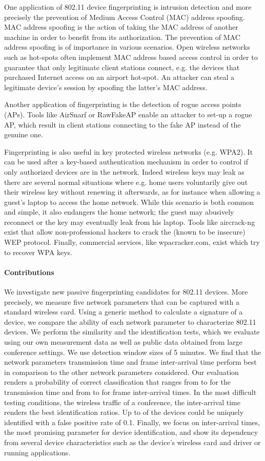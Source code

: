 \documentclass[10pt, conference, compsocconf, letterpaper]{IEEEtran}
\begin{document}
One application of 802.11 device fingerprinting is intrusion detection and more precisely
the prevention of Medium Access Control (MAC) address spoofing. 
MAC address spoofing is the action of taking the MAC address of another machine in order to 
benefit from its authorization. The prevention of MAC address spoofing is of importance in various scenarios.
Open wireless networks such as hot-spots often implement MAC address based access control in order
to guarantee that only legitimate client stations connect, e.g. the devices that purchased Internet access 
on an airport hot-spot.
An attacker can steal a legitimate device's session by spoofing the latter's MAC address.

Another application of fingerprinting is the detection of rogue access points (APs). 
Tools like AirSnarf 
or RawFakeAP 
enable an attacker to set-up a rogue AP, which result in client stations connecting to the fake AP instead of the genuine one.

Fingerprinting is also useful in key protected wireless networks (e.g. WPA2).
It can be used after a key-based authentication mechanism in order to control if only authorized devices are in the network.
Indeed wireless keys may leak as there are several normal situations where 
e.g. home users voluntarily give out their wireless key without renewing it afterwards, as
for instance when allowing a guest's laptop to access the home network.
While this scenario is both common and simple, it also endangers the home network;
the guest may abusively reconnect or the key may eventually leak from his laptop.
Tools like aircrack-ng exist that allow non-professional hackers to crack the (known to be insecure) WEP protocol.
Finally, commercial services, like wpacracker.com, exist which try to recover WPA keys. 

\paragraph{Contributions}
We investigate new passive fingerprinting candidates for 802.11 devices.
More precisely, we measure five network parameters that can be captured with a standard wireless card. 
Using a generic method to calculate a signature of a device, we compare the ability of 
each network parameter to characterize 802.11 devices.
We perform the similarity and the identification tests, which we evaluate using our own measurement data as well as public data obtained from large conference settings. We use detection window sizes of 5 minutes.
We find that the network parameters transmission time and frame inter-arrival time perform best in comparison to the other network parameters considered. Our evaluation renders a probability of correct classification that ranges from  to  for the transmission time and from  to  for frame inter-arrival times.
In the most difficult testing conditions, the wireless traffic of a conference, the inter-arrival time renders the best identification ratios. Up to  of the devices could be uniquely identified with a false positive rate of 0.1.
Finally, we focus on inter-arrival times, the most promising parameter for device identification, and show its dependency from several device characteristics such as the device's wireless card and driver or running applications.
\end{document}
